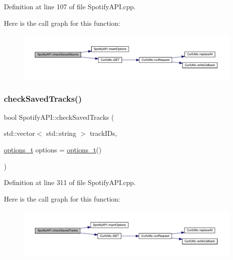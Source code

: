 Definition at line 107 of file Spotify\+A\+P\+I.\+cpp.

Here is the call graph for this function\+:
\nopagebreak
\begin{figure}[H]
\begin{center}
\leavevmode
\includegraphics[width=350pt]{class_spotify_a_p_i_a4a32dc278f53d67df8037b9a57b9d776_cgraph}
\end{center}
\end{figure}
\mbox{\label{class_spotify_a_p_i_a455d2433471b1bbeedcf1003e56c3381}} 
\subsubsection{\texorpdfstring{check\+Saved\+Tracks()}{checkSavedTracks()}}
{\footnotesize\ttfamily bool Spotify\+A\+P\+I\+::check\+Saved\+Tracks (\begin{DoxyParamCaption}\item[{std\+::vector$<$ std\+::string $>$}]{track\+I\+Ds,  }\item[{\mbox{\hyperlink{_spotify_a_p_i_8h_a0ff5cac1a4007bb330b7d9939650c283}{options\+\_\+t}}}]{options = {\ttfamily \mbox{\hyperlink{_spotify_a_p_i_8h_a0ff5cac1a4007bb330b7d9939650c283}{options\+\_\+t}}()} }\end{DoxyParamCaption})}



Definition at line 311 of file Spotify\+A\+P\+I.\+cpp.

Here is the call graph for this function\+:
\nopagebreak
\begin{figure}[H]
\begin{center}
\leavevmode
\includegraphics[width=350pt]{class_spotify_a_p_i_a455d2433471b1bbeedcf1003e56c3381_cgraph}
\end{center}
\end{figure}
\mbox{\label{class_spotify_a_p_i_a7eb589d3b0696f9c9cf4a196cef1c627}} 
